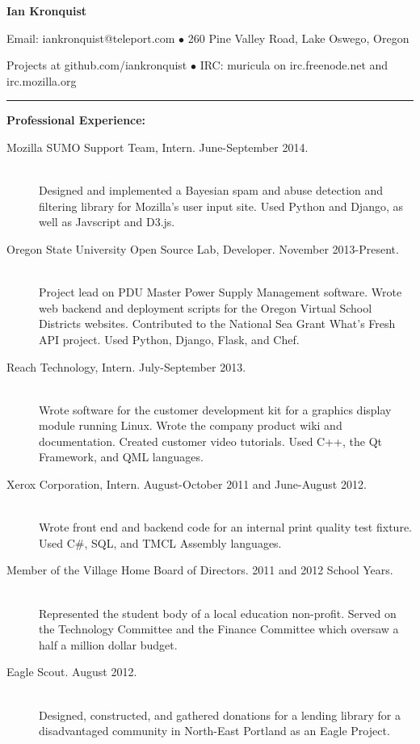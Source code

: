 \documentclass[11pt]{article}
\begin{document}
\centerline{{\LARGE \bf Ian Kronquist}}

\bigskip

\centerline{
	Email: iankronquist@teleport.com
	$\bullet$
	260 Pine Valley Road, Lake Oswego, Oregon
}
\centerline{
	Projects at github.com/iankronquist
	$\bullet$
        IRC: muricula on irc.freenode.net and irc.mozilla.org
}


\bigskip

\hrule

\bigskip

{\Large \bf Professional Experience:}
\normalsize
\begin{description}
	\item[Mozilla SUMO Support Team, Intern.
		\hfill June-September 2014.]
		\hfill \\
		Designed and implemented a Bayesian spam and abuse detection and
		filtering library for Mozilla's user input site.
		Used Python and Django, as well as Javscript and D3.js.

	\item[Oregon State University Open Source Lab, Developer.
		\hfill November 2013-Present.]
		\hfill \\
		Project lead on PDU Master Power Supply Management software.
		Wrote web backend and deployment scripts for the 
		Oregon Virtual School Districts websites. 
		Contributed to the National Sea Grant What's Fresh API project.
		Used Python, Django, Flask, and Chef.

	\item[Reach Technology, Intern.
		\hfill July-September 2013.]
		\hfill \\
		Wrote software for the customer development kit for a graphics
		display module running Linux. Wrote the company product wiki 
		and documentation. Created customer video tutorials. Used C++,
		the Qt Framework, and QML languages.

	\item[Xerox Corporation, Intern.
		\hfill  August-October 2011 and June-August 2012.]
		\hfill \\
		Wrote front end and backend code for an internal print quality
		test fixture.
		Used C\#, SQL, and TMCL Assembly languages.

	\item[Member of the Village Home Board of Directors.
		\hfill 2011 and 2012 School Years.]
		\hfill \\
		Represented the student body of a local education
		non-profit.
		Served on the Technology Committee and the Finance
		Committee which oversaw a half a million dollar budget.

	\item[Eagle Scout.
		\hfill August 2012.]
		\hfill \\
		Designed, constructed, and gathered donations for a lending library
		for a disadvantaged community in North-East Portland as an Eagle
		Project.
\end{description}
\end{document}
